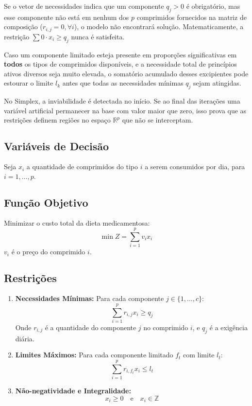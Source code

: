 \documentclass[12pt,a4paper]{article}
\begin{document}
Se o vetor de necessidades indica que um componente $q_j > 0$ é obrigatório, mas esse componente não está em nenhum dos $p$ comprimidos fornecidos na matriz de composição ($r_{i,j} = 0, \forall i$), o modelo não encontrará solução. Matematicamente, a restrição $\sum 0 \cdot x_i \ge q_j$ nunca é satisfeita.

Caso um componente limitado esteja presente em proporções significativas em \textbf{todos} os tipos de comprimidos disponíveis, e a necessidade total de princípios ativos diversos seja muito elevada, o somatório acumulado desses excipientes pode estourar o limite $l_k$ antes que todas as necessidades mínimas $q_j$ sejam atingidas.

No Simplex, a inviabilidade é detectada no início. Se ao final das iterações uma variável artificial permanecer na base com valor maior que zero, isso prova que as restrições definem regiões no espaço $\mathbb{R}^p$ que não se interceptam.

\subsection{Variáveis de Decisão}
Seja $x_i$ a quantidade de comprimidos do tipo $i$ a serem consumidos por dia, para $i = 1, \dots, p$. 

\subsection{Função Objetivo}
Minimizar o custo total da dieta medicamentosa:
\[ \min Z = \sum_{i=1}^{p} v_i x_i \]
$v_i$ é o preço do comprimido $i$.

\subsection{Restrições}
\begin{enumerate}
    \item \textbf{Necessidades Mínimas:} Para cada componente $j \in \{1, \dots, c\}$:
    \[ \sum_{i=1}^{p} r_{i,j} x_i \ge q_j \]
    Onde $r_{i,j}$ é a quantidade do componente $j$ no comprimido $i$, e $q_j$ é a exigência diária.
    
    \item \textbf{Limites Máximos:} Para cada componente limitado $f_t$ com limite $l_t$:
    \[ \sum_{i=1}^{p} r_{i,f_t} x_i \le l_t \]
    
    \item \textbf{Não-negatividade e Integralidade:}
    \[ x_i \ge 0 \quad \text{e} \quad x_i \in \mathbb{Z} \]
\end{enumerate}
\end{document}
